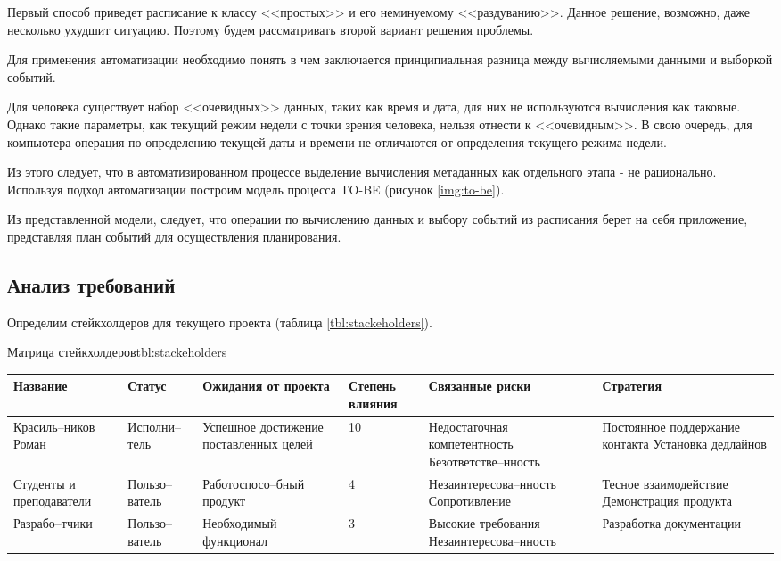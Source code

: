 Первый способ приведет расписание к классу <<простых>> и его неминуемому <<раздуванию>>.
Данное решение, возможно, даже несколько ухудшит ситуацию.
Поэтому будем рассматривать второй вариант решения проблемы.

Для применения автоматизации необходимо понять в чем заключается принципиальная разница между вычисляемыми данными и выборкой событий.

Для человека существует набор <<очевидных>> данных, таких как время и дата, для них не используются вычисления как таковые.
Однако такие параметры, как текущий режим недели с точки зрения человека, нельзя отнести к <<очевидным>>.
В свою очередь, для компьютера операция по определению текущей даты и времени не отличаются от определения текущего режима недели.

Из этого следует, что в автоматизированном процессе выделение вычисления метаданных как отдельного этапа - не рационально.
Используя подход автоматизации построим модель процесса TO-BE (рисунок \ref{img:to-be}).


Из представленной модели, следует, что операции по вычислению данных и выбору событий из расписания берет на себя приложение, представляя план событий для осуществления планирования.

\subsection{Анализ требований}

Определим стейкхолдеров для текущего проекта (таблица \ref{tbl:stackeholders}).

\begin{tbl}{Матрица стейкхолдеров}{tbl:stackeholders}
  \begin{tabularx}{\textwidth}{| p{1.6cm} | p{1.5cm} | X | p{1.5cm} | X | X |}
  \hline Название
  & Статус
  & Ожидания от проекта
  & Степень влияния
  & Связанные риски
  & Стратегия \\
  \hline Красиль--ников Роман
  & Исполни--тель
  & Успешное достижение поставленных целей
  & 10
  & Недостаточная компетентность \newline Безответстве--нность
  & Постоянное поддержание контакта \newline Установка дедлайнов \\
  \hline Студенты и преподаватели
  & Пользо--ватель
  & Работоспосо--бный продукт
  & 4
  & Незаинтересова--нность \newline Сопротивление
  & Тесное взаимодействие \newline Демонстрация продукта \\
  \hline Разрабо--тчики
  & Пользо--ватель
  & Необходимый функционал
  & 3
  & Высокие требования \newline Незаинтересова--нность
  & Разработка документации \\
  \hline
  \end{tabularx}
\end{tbl}

